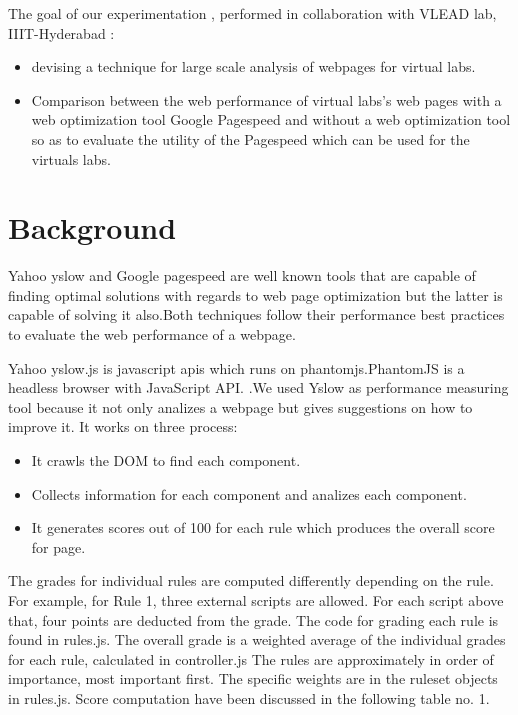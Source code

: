 \documentclass[11pt]{article}
\begin{document}
The goal of our experimentation , performed in collaboration with VLEAD lab, IIIT-Hyderabad :\\

\begin{itemize}
\item devising a technique for large scale analysis of webpages for virtual labs.\\
\item Comparison between the web performance of virtual labs's  web pages with a web optimization tool Google Pagespeed and without a web optimization tool so as to evaluate the utility of the Pagespeed which can be used for the virtuals labs.
\end{itemize}
\section{Background}
\label{sec-3}


Yahoo yslow and Google pagespeed are well known tools that are capable of finding optimal solutions with regards to web page optimization but the latter is capable of solving it also.Both techniques follow their performance best practices to evaluate the web performance of a webpage.

Yahoo yslow.js is javascript apis which runs on phantomjs.PhantomJS is a headless browser with JavaScript API. .We used Yslow as performance measuring tool because it not only analizes a webpage but gives suggestions on how to improve it.
It works on three process:
\begin{itemize}
\item It crawls the DOM to find each component.
\item Collects information for each component and analizes each component.
\item It generates scores out of 100 for each rule which produces the overall score for page.
\end{itemize}
The grades for individual rules are computed differently depending on the rule. For example, for Rule 1, three external scripts are allowed. For each script above that, four points are deducted from the grade. The code for grading each rule is found in rules.js. The overall grade is a weighted average of the individual grades for each rule, calculated in controller.js The rules are approximately in order of importance, most important first. The specific weights are in the ruleset objects in rules.js. Score computation have been discussed in the following table no. 1.
\end{document}
